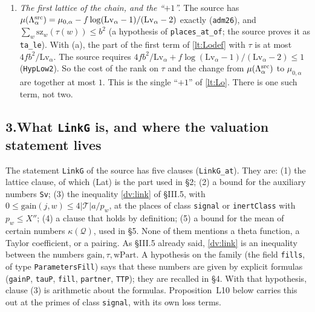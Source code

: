 \documentclass[11pt,letterpaper]{article}
\begin{document}
\begin{enumerate}[label=\textup{(\alph*)},leftmargin=2.4em,itemsep=1pt,topsep=2pt]
\texttt{SizeQD}), and two further hypotheses on the family:
$\log\mathrm{Lv}_\alpha\le C_{\rm lv}X''$ and $\log D_\alpha\le C_{\rm den}X''$ (\texttt{MuTu},
\texttt{MuDGam}). This gives the constant $2(\log4+3+C_{\rm lv}+C_{\rm den})$ in \texttt{NprimeMuR}
(\texttt{nprimeMuR\_at}, \texttt{linkMu}). It also assumes that the glued lattices are finitely generated
and have positive rank (\texttt{MuFG}, \texttt{MuRank}).
These hypotheses are assumed here. The names of this item were not put to the dependency computation.
\item \emph{The first lattice of the chain, and the ``$+1$''.} The source has
$\mu(\Lambda^{\rm src}_\alpha)=\mu_{0,\alpha}-f\log(\mathrm{Lv}_\alpha-1)/(\mathrm{Lv}_\alpha-2)$ exactly
(\texttt{adm26}), and $\sum_w\mathrm{sz}_w(\tau(w))\le b^2$ (a hypothesis of \texttt{places\_at\_of}; the source proves it as \texttt{ta\_le}). With (a), the part of the first term of
\eqref{lt:Lodef} with $\tau$ is at most $4fb^2/\mathrm{Lv}_\alpha$. The source requires
$4fb^2/\mathrm{Lv}_\alpha+f\log(\mathrm{Lv}_\alpha-1)/(\mathrm{Lv}_\alpha-2)\le1$ (\texttt{HypLow2}). So the
cost of the rank on $\tau$ and the change from $\mu(\Lambda^{\rm src}_\alpha)$ to $\mu_{0,\alpha}$ are
together at most $1$. This is the single ``$+1$'' of \eqref{lt:Lo}. There is one such term, not two.
\end{enumerate}

\subsection*{3.\quad What \texttt{LinkG} is, and where the valuation statement lives}

The statement \texttt{LinkG} of the source has five clauses (\texttt{LinkG\_at}). They are:
(1) the lattice clause, of which \textup{(Lat)} is the part used in \S2; (2) a bound for the auxiliary numbers \texttt{Sv}; (3) the
inequality \eqref{dv:link} of \S III.5, with $0\le\mathrm{gain}(j,w)\le4|\mathcal T|a/p_w$, at the places of
class \texttt{signal} or \texttt{inertClass} with $p_w\le X''$; (4) a clause that holds by definition; (5) a
bound for the mean of certain numbers $\kappa(\mathcal Q)$, used in \S5. None of them mentions a theta
function, a Taylor coefficient, or a pairing. As \S III.5 already said, \eqref{dv:link} is an inequality
between the numbers $\mathrm{gain},\tau,\mathrm{wPart}$. A hypothesis on the family (the field
\texttt{fills}, of type \texttt{ParametersFill}) says that these numbers are given by explicit formulas
(\texttt{gainP}, \texttt{tauP}, \texttt{fill}, \texttt{partner}, \texttt{TTP}); they are recalled in \S4.
With that hypothesis, clause (3) is arithmetic about the formulas. Proposition~L10 below carries this out
at the primes of class \texttt{signal}, with its own loss terms.
\end{document}
